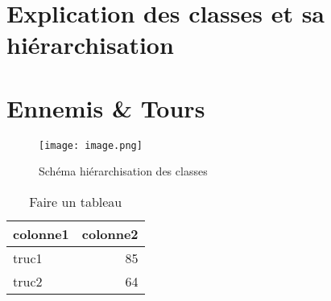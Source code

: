 \documentclass{article}
\begin{document}
\section{Explication des classes et sa hiérarchisation}

\section{Ennemis \& Tours}

\begin{figure}
    \centering
    \texttt{[image: image.png]}
    \caption{Schéma hiérarchisation des classes}
    \label{fig:enter-label}
\end{figure}


\begin{table}
\centering
\begin{tabular}{l|r}
colonne1 & colonne2 \\\hline
truc1 & 85 \\
truc2 & 64
\end{tabular}
\caption{\label{tab:widgets}Faire un tableau}
\end{table}
\end{document}
